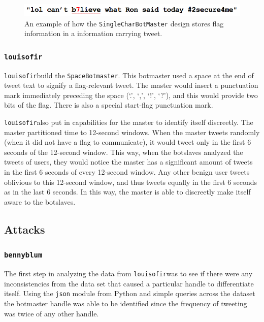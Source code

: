 \documentclass[11pt, oneside]{article} %
\numberwithin{equation}{section} %
\numberwithin{figure}{section} %
\numberwithin{table}{section} %
\renewcommand{\c}[1]{\texttt{#1}}
\newcommand{\teambb}{\c{bennyblum}}
\newcommand{\teamol}{\c{louisofir}}
\begin{document}
		 \begin{figure}[H]
		    \center\includegraphics[scale=0.60]{resources/prng-tweet-ex.png}
		    \caption{An example of how the \c{SingleCharBotMaster} design stores flag information in a information carrying tweet.}
		    \label{fig:prng-tweet-ex}
		 \end{figure}
		
			
		\subsubsection{\teamol}
			\teamol build the \c{SpaceBotmaster}.  This botmaster used a space at the end of tweet text to signify a flag-relevant tweet.  The master would insert a punctuation mark immediately preceding the space (`.', `,', `!', `?'), and this would provide two bits of the flag.  There is also a special start-flag punctuation mark.  

			\teamol also put in capabilities for the master to identify itself discreetly.  The master partitioned time to 12-second windows.  When the master tweets randomly (when it did not have a flag to communicate), it would tweet only in the first 6 seconds of the 12-second window.  This way, when the botslaves analyzed the tweets of users, they would notice the master has a significant amount of tweets in the first 6 seconds of every 12-second window.  Any other benign user tweets oblivious to this 12-second window, and thus tweets equally in the first 6 seconds as in the last 6 seconds.  In this way, the master is able to discreetly make itself aware to the botslaves.

	\subsection{Attacks}
		\subsubsection{\teambb}
			The first step in analyzing the data from \teamol was to see if there were any inconsistencies from the data set that caused a particular handle to differentiate itself. Using the \c{json} module from Python and simple queries across the dataset the botmaster handle was able to be identified since the frequency of tweeting was twice of any other handle. \\
\end{document}
